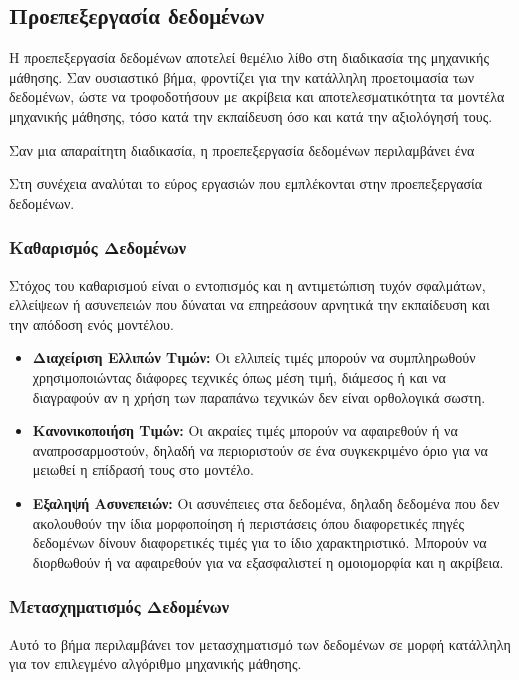 \documentclass[12pt,twoside]{article}
\newcommand{\gr}{\selectlanguage{greek}}
\begin{document}
\subsection{\gr Προεπεξεργασία δεδομένων}

Η προεπεξεργασία δεδομένων αποτελεί θεμέλιο λίθο στη διαδικασία της μηχανικής μάθησης. Σαν ουσιαστικό βήμα, φροντίζει για την κατάλληλη προετοιμασία των δεδομένων, ώστε να τροφοδοτήσουν με ακρίβεια και αποτελεσματικότητα τα μοντέλα μηχανικής μάθησης, τόσο κατά την εκπαίδευση όσο και κατά την αξιολόγησή τους.

Σαν μια απαραίτητη διαδικασία, η προεπεξεργασία δεδομένων περιλαμβάνει ένα

Στη συνέχεια αναλύται το εύρος εργασιών που εμπλέκονται στην προεπεξεργασία δεδομένων.

\subsubsection{\gr Καθαρισμός Δεδομένων}

Στόχος του καθαρισμού είναι ο εντοπισμός και η αντιμετώπιση τυχόν σφαλμάτων, ελλείψεων ή ασυνεπειών που δύναται να επηρεάσουν αρνητικά την εκπαίδευση και την απόδοση ενός μοντέλου.

\begin{itemize}
    \item \textbf{\gr Διαχείριση Ελλιπών Τιμών:} Οι ελλιπείς τιμές μπορούν να συμπληρωθούν χρησιμοποιώντας διάφορες τεχνικές όπως μέση τιμή, διάμεσος ή και να διαγραφούν αν η χρήση των παραπάνω τεχνικών δεν είναι ορθολογικά σωστη.
    \item \textbf{\gr Κανονικοποιήση Τιμών:} Οι ακραίες τιμές μπορούν να αφαιρεθούν ή να αναπροσαρμοστούν, δηλαδή να περιοριστούν σε ένα συγκεκριμένο όριο για να μειωθεί η επίδρασή τους στο μοντέλο.
    \item \textbf{\gr Εξαληψή Ασυνεπειών:} Οι ασυνέπειες στα δεδομένα, δηλαδη δεδομένα που δεν ακολουθούν την ίδια μορφοποίηση ή περιστάσεις όπου διαφορετικές πηγές δεδομένων δίνουν διαφορετικές τιμές για το ίδιο χαρακτηριστικό. Μπορούν να διορθωθούν ή να αφαιρεθούν για να εξασφαλιστεί η ομοιομορφία και η ακρίβεια.
\end{itemize}

\subsubsection{\gr Μετασχηματισμός Δεδομένων}

Αυτό το βήμα περιλαμβάνει τον μετασχηματισμό των δεδομένων σε μορφή κατάλληλη για τον επιλεγμένο αλγόριθμο μηχανικής μάθησης.
\end{document}
